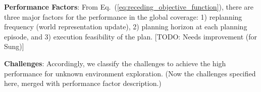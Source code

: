 \documentclass[letterpaper]{article} %
\newcommand{\ph}[1]{{\textbf{#1}:}} %
\begin{document}
\ph{Performance Factors}
From Eq.~(\ref{eq:receding_objective_function}), there are three major factors for the performance in the global coverage: 1) replanning frequency (world representation update), 2) planning horizon at each planning episode, and 3) execution feasibility of the plan. [TODO: Needs improvement (for Sung)]

\ph{Challenges}
Accordingly, we classify the challenges to achieve the high performance for unknown environment exploration.
(Now the challenges specified here, merged with performance factor description.)


\end{document}

